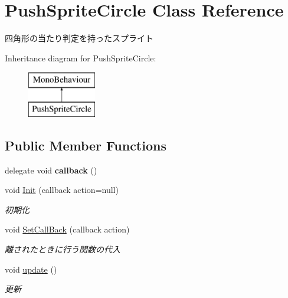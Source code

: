 \hypertarget{class_push_sprite_circle}{}\section{Push\+Sprite\+Circle Class Reference}
\label{class_push_sprite_circle}


四角形の当たり判定を持ったスプライト  


Inheritance diagram for Push\+Sprite\+Circle\+:\begin{figure}[H]
\begin{center}
\leavevmode
\includegraphics[height=2.000000cm]{class_push_sprite_circle}
\end{center}
\end{figure}
\subsection*{Public Member Functions}
\begin{DoxyCompactItemize}
\item 
delegate void {\bfseries callback} ()\hypertarget{class_push_sprite_circle_a19c5d07a0cf70f360b35a102cd5a7630}{}\label{class_push_sprite_circle_a19c5d07a0cf70f360b35a102cd5a7630}

\item 
void \hyperlink{class_push_sprite_circle_a016cadae34ba4c9445dffe122ca6592b}{Init} (callback action=null)
\begin{DoxyCompactList}\small\item\em 初期化 \end{DoxyCompactList}\item 
void \hyperlink{class_push_sprite_circle_a06299e5b04cea23a07ac0c5efe3037b6}{Set\+Call\+Back} (callback action)
\begin{DoxyCompactList}\small\item\em 離されたときに行う関数の代入 \end{DoxyCompactList}\item 
void \hyperlink{class_push_sprite_circle_a409c3ca3dd1c0f12ee4e9d3b0646bc85}{update} ()
\begin{DoxyCompactList}\small\item\em 更新 \end{DoxyCompactList}\end{DoxyCompactItemize}


